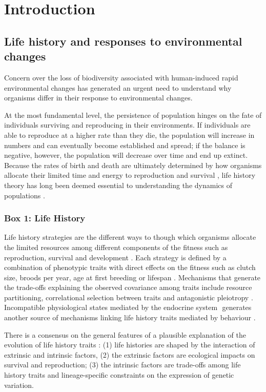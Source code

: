 \chapter{Introduction}\label{ch:intro}


\section{Life history and responses to environmental changes}

Concern over the loss of biodiversity associated with human-induced rapid 
environmental changes has generated an urgent need to understand why organisms 
differ in their response to environmental changes. 

At the most fundamental level, the persistence of population hinges on the fate 
of individuals surviving and reproducing in their environments. If individuals 
are able to reproduce at a higher rate than they die, the population will 
increase in numbers and can eventually become established and spread; if the 
balance is negative, however, the population will decrease over time and end up 
extinct.
Because the rates of birth and death are ultimately determined by how
organisms allocate their limited time and energy to reproduction and survival 
\citep{stearns1992evolution}, life history theory has long been deemed essential
to understanding the dynamics of populations \citep{Saether2004, Sol2012a}.


\begin{small}
\begin{framed}
\subsection*{Box 1: Life History}
Life history strategies are the different ways to though which organisms
allocate the limited resources among different components of the fitness such
as reproduction, survival and development
\citep{stearns1992evolution,roff2002}⁠.
Each strategy is defined by a combination of phenotypic traits with direct
effects on the fitness such as clutch size, broods per year, age at first
breeding or lifespan \citep{Violle2007}⁠.
Mechanisms that generate the trade-offs explaining the observed covariance
among traits include resource partitioning, correlational selection between
traits and antagonistic pleiotropy \citep{Roff2007, Stearns1989a}.
Incompatible physiological states mediated by the endocrine system
\citep{Ricklefs2002}⁠ generates another source of mechanisms linking life
history traits mediated by behaviour \citep{Reale2010a}.

There is a consensus on the general features of a plausible explanation of the
evolution of life history traits \citep{Stearns2000}⁠: (1) life histories
are shaped by the interaction of extrinsic and intrinsic factors, (2) the
extrinsic factors are ecological impacts on survival and reproduction; (3) the
intrinsic factors are trade-offs among life history traits and lineage-specific
constraints on the expression of genetic variation.
\end{framed}
\end{small}


